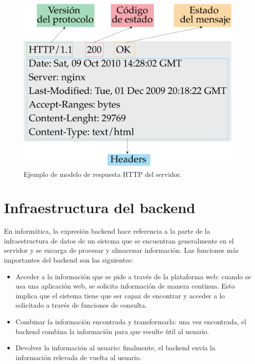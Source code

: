 \begin{figure}[htpb]
	\centering
	\includegraphics[scale=.50]{./Figures/respuesta-http.png}
	\caption[Modelo de respuesta HTTP ]{Ejemplo de modelo de respuesta HTTP del servidor.}
	\label{fig:respuesta-http}
\end{figure}


\section{Infraestructura del backend}

En informática, la expresión backend hace referencia a la parte de la infraestructura de datos de un sistema que se encuentran generalmente en el servidor y se encarga de procesar y almacenar información.  Las funciones más importantes del backend son las siguientes:

\begin{itemize}
	\item Acceder a la información que se pide a través de la plataforma web: cuando se usa una aplicación web, se solicita información de manera continua. Esto implica que el sistema tiene que ser capaz de encontrar y acceder a lo solicitado a través de funciones de consulta. 
	
	\item Combinar la información encontrada y transformarla: una vez encontrada, el backend combina la información para que resulte útil al usuario.
	
	\item Devolver la información al usuario:  finalmente, el backend envía la información relevada de vuelta al usuario. 
	
\end{itemize}


